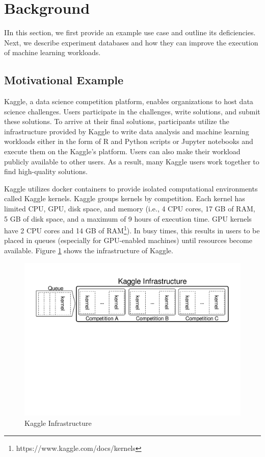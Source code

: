 \section{Background} \label{sec-background}
IIn this section, we first provide an example use case and outline its deficiencies.
Next, we describe experiment databases and how they can improve the execution of machine learning workloads.

\subsection{Motivational Example}\label{subsec-motivational-example}
Kaggle, a data science competition platform, enables organizations to host data science challenges.
Users participate in the challenges, write solutions, and submit these solutions.
To arrive at their final solutions, participants utilize the infrastructure provided by Kaggle to write data analysis and machine learning workloads either in the form of R and Python scripts or Jupyter notebooks and execute them on the Kaggle's platform.
Users can also make their workload publicly available to other users.
As a result, many Kaggle users work together to find high-quality solutions.

Kaggle utilizes docker containers to provide isolated computational environments called Kaggle kernels.
Kaggle groups kernels by competition.
Each kernel has limited CPU, GPU, disk space, and memory (i.e., 4 CPU cores, 17 GB of RAM, 5 GB of disk space, and a maximum of 9 hours of execution time. GPU kernels have 2 CPU cores and 14 GB of RAM\footnote{https://www.kaggle.com/docs/kernels}).
In busy times, this results in users to be placed in queues (especially for GPU-enabled machines) until resources become available.
Figure \ref{example-use-case} shows the infrastructure of Kaggle.

\begin{figure}
\centering
\includegraphics[width=\columnwidth]{../images/example-use-case}
\caption{Kaggle Infrastructure}
\label{example-use-case}
\end{figure}

